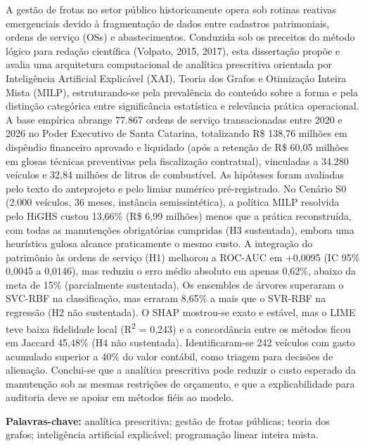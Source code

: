 \begin{resumo}
A gestão de frotas no setor público historicamente opera sob rotinas reativas emergenciais devido à fragmentação de dados entre cadastros patrimoniais, ordens de serviço (OSs) e abastecimentos. Conduzida sob os preceitos do método lógico para redação científica (Volpato, 2015, 2017), esta dissertação propõe e avalia uma arquitetura computacional de analítica prescritiva orientada por Inteligência Artificial Explicável (XAI), Teoria dos Grafos e Otimização Inteira Mista (MILP), estruturando-se pela prevalência do conteúdo sobre a forma e pela distinção categórica entre significância estatística e relevância prática operacional. A base empírica abrange 77.867 ordens de serviço transacionadas entre 2020 e 2026 no Poder Executivo de Santa Catarina, totalizando R\$ 138,76 milhões em dispêndio financeiro aprovado e liquidado (após a retenção de R\$ 60,05 milhões em glosas técnicas preventivas pela fiscalização contratual), vinculadas a 34.280 veículos e 32,84 milhões de litros de combustível. As hipóteses foram avaliadas pelo texto do anteprojeto e pelo limiar numérico pré-registrado. No Cenário S0 (2.000 veículos, 36 meses, instância semissintética), a política MILP resolvida pelo HiGHS custou 13,66\% (R\$ 6,99 milhões) menos que a prática reconstruída, com todas as manutenções obrigatórias cumpridas (H3 sustentada), embora uma heurística gulosa alcance praticamente o mesmo custo. A integração do patrimônio às ordens de serviço (H1) melhorou a ROC-AUC em +0,0095 (IC 95\% 0,0045 a 0,0146), mas reduziu o erro médio absoluto em apenas 0,62\%, abaixo da meta de 15\% (parcialmente sustentada). Os ensembles de árvores superaram o SVC-RBF na classificação, mas erraram 8,65\% a mais que o SVR-RBF na regressão (H2 não sustentada). O SHAP mostrou-se exato e estável, mas o LIME teve baixa fidelidade local (R\textsuperscript{2} = 0,243) e a concordância entre os métodos ficou em Jaccard 45,48\% (H4 não sustentada). Identificaram-se 242 veículos com gasto acumulado superior a 40\% do valor contábil, como triagem para decisões de alienação. Conclui-se que a analítica prescritiva pode reduzir o custo esperado da manutenção sob as mesmas restrições de orçamento, e que a explicabilidade para auditoria deve se apoiar em métodos fiéis ao modelo.

\vspace{\onelineskip}
\noindent
\textbf{Palavras-chave:} analítica prescritiva; gestão de frotas públicas; teoria dos grafos; inteligência artificial explicável; programação linear inteira mista.
\end{resumo}
